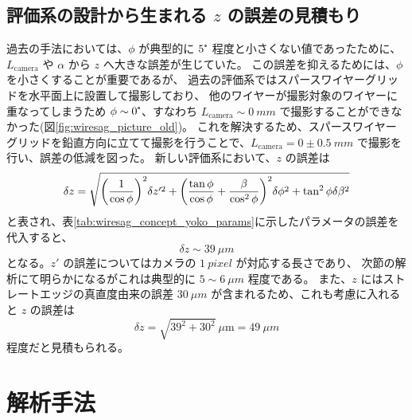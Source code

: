 \documentclass[../../main.tex]{subfiles}
\begin{document}
\subsection{評価系の設計から生まれる $z$ の誤差の見積もり}
過去の手法においては、$\phi$ が典型的に $5\tcdegree$ 程度と小さくない値であったために、
$L_{\mathrm{camera}}$ や $\alpha$ から $z$ へ大きな誤差が生じていた\cite{swg:murata}。
この誤差を抑えるためには、$\phi$ を小さくすることが重要であるが、
過去の評価系ではスパースワイヤーグリッドを水平面上に設置して撮影しており、
他のワイヤーが撮影対象のワイヤーに重なってしまうため $\phi\sim 0\tcdegree$、すなわち 
$L_{\mathrm{camera}} \sim \SI{0}{mm}$ で撮影することができなかった(図\ref{fig:wiresag_picture_old})。
これを解決するため、スパースワイヤーグリッドを鉛直方向に立てて撮影を行うことで、$L_{\mathrm{camera}}=0\pm\SI{0.5}{mm}$ で撮影を行い、誤差の低減を図った。
新しい評価系において、$z$ の誤差は
\begin{align}
    \delta z = \sqrt{\qty(\dfrac{1}{\cos\phi})^2\delta z'^2 + \qty(\dfrac{\tan\phi}{\cos\phi}+\dfrac{\beta}{\cos^2\phi})^2\delta\phi^2 + \tan^2\phi\delta\beta^2}
\end{align}
と表され、表\ref{tab:wiresag_concept_yoko_params}に示したパラメータの誤差を代入すると、
\begin{equation}
    \delta z \sim \SI{39}{\mu m}
\end{equation}
となる。$z'$ の誤差についてはカメラの $\SI{1}{pixel}$ が対応する長さであり、
次節の解析にて明らかになるがこれは典型的に $5\sim\SI{6}{\mu m}$ 程度である。
また、$z$ にはストレートエッジの真直度由来の誤差 $\SI{30}{\mu m}$ が含まれるため、これも考慮に入れると $z$ の誤差は
\begin{equation}
    \delta z = \sqrt{39^2+30^2}\ \mu\mathrm{m} = \SI{49}{\mu m}
\end{equation}
程度だと見積もられる。

\section{解析手法}
\end{document}
